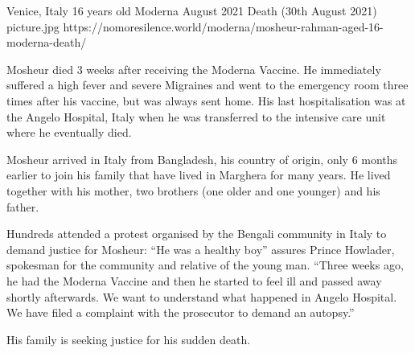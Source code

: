 {Venice, Italy}
{16 years old}
{Moderna}
{August 2021}
{Death (30th August 2021)}
{picture.jpg}
{https://nomoresilence.world/moderna/mosheur-rahman-aged-16-moderna-death/}
{

Mosheur died 3 weeks after receiving the Moderna Vaccine. He immediately suffered a high fever and severe Migraines and went to the emergency room three times after his vaccine, but was always sent home. His last hospitalisation was at the Angelo Hospital, Italy when he was transferred to the intensive care unit where he eventually died.

Mosheur arrived in Italy from Bangladesh, his country of origin, only 6 months earlier to join his family that have lived in Marghera for many years. He lived together with his mother, two brothers (one older and one younger) and his father.

Hundreds attended a protest organised by the Bengali community in Italy to demand justice for Mosheur:
“He was a healthy boy” assures Prince Howlader, spokesman for the community and relative of the young man. “Three weeks ago, he had the Moderna Vaccine and then he started to feel ill and passed away shortly afterwards. We want to understand what happened in Angelo Hospital. We have filed a complaint with the prosecutor to demand an autopsy.”

His family is seeking justice for his sudden death.
}
